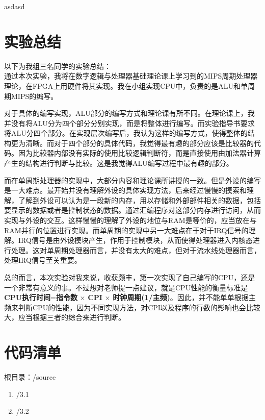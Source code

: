 \documentclass[a4paper]{article}
\begin{document}
	asdasd

	\section{实验总结}
	以下为我组三名同学的实验总结：\\
	
	
	通过本次实验，我将在数字逻辑与处理器基础理论课上学习到的MIPS周期处理器理论，在FPGA上用硬件将其实现。我在小组实现CPU中，负责的是ALU和单周期MIPS的编写。
	
	对于具体的编写实现，ALU部分的编写方式和理论课有所不同。在理论课上，我并没有将ALU分为四个部分分别实现，而是将整体进行编写。而实验指导书要求将ALU分四个部分。在实现层次编写后，我认为这样的编写方式，使得整体的结构更为清晰。而对于四个部分的具体代码，我觉得最有趣的部分应该是比较器的代码。因为比较器内部没有实际的使用比较逻辑判断符，而是直接使用由加法器计算产生的结构进行判断与比较。这是我觉得ALU编写过程中最有趣的部分。
	
	而在单周期处理器的实现中，大部分内容和理论课所讲授的一致。但是外设的编写是一大难点。最开始并没有理解外设的具体实现方法，后来经过慢慢的摸索和理解，了解到外设可以认为是一段新的内存，用以存储和外部部件相关的数据，包括要显示的数据或者是控制状态的数据。通过汇编程序对这部分内存进行访问，从而实现与外设的交互。这样慢慢的理解了外设的地位与RAM是等价的，应当放在与RAM并行的位置进行实现。而单周期的实现中另一大难点在于对于IRQ信号的理解。IRQ信号是由外设模块产生，作用于控制模块，从而使得处理器进入内核态进行处理。这对单周期处理器而言，并没有太大的难点，但对于流水线处理器而言，处理IRQ信号至关重要。
	
	总的而言，本次实验对我来说，收获颇丰，第一次实现了自己编写的CPU，还是一个非常有意义的事。不过想对老师提一点建议，就是CPU性能的衡量标准是\textbf{CPU执行时间}=\textbf{指令数} $\times$ \textbf{CPI} $\times$ \textbf{时钟周期(1/主频)}。因此，并不能单单根据主频来判断CPU的性能，因为不同实现方法，对CPI以及程序的行数的影响也会比较大，应当根据三者的综合来进行判断。

	\renewcommand{\UrlFont}{\small\tt}
	

\appendix
	\section{代码清单} \label{app:app1}
	
	根目录：/source
		\begin{enumerate}
		\item /3.1
		\item /3.2
		\end{enumerate}
\end{document}
